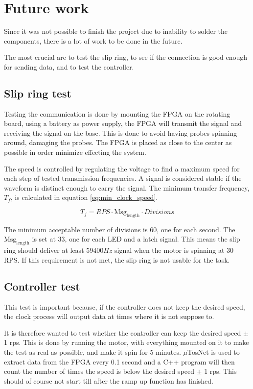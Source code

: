 \section{Future work}
Since it was not possible to finish the project due to inability to solder the components, there is a lot of work to be done in the future.
 
The most crucial are to test the slip ring, to see if the connection is good enough for sending data, and to test the controller.

\subsection{Slip ring test}

Testing the communication is done by mounting the FPGA on the rotating board, using a battery as power supply, the FPGA will transmit the signal and receiving the signal on the base.
This is done to avoid having probes spinning around, damaging the probes.
The FPGA is placed as close to the center as possible in order minimize effecting the system.

The speed is controlled by regulating the voltage to find a maximum speed for each step of tested transmission frequencies.
A signal is considered stable if the waveform is distinct enough to carry the signal.
The minimum transfer frequency, $T_f$, is calculated in equation \ref{eq:min_clock_speed}.

\begin{equation}
  T_f = {RPS \cdot \text{Msg}_\text{length} \cdot Divisions }
 \label{eq:min_clock_speed}
\end{equation}

The minimum acceptable number of divisions is 60, one for each second.
The $\text{Msg}_\text{length}$ is set at 33, one for each LED and a latch signal.
This means the slip ring should deliver at least $59400 Hz$ signal when the motor is spinning at 30 RPS.
If this requirement is not met, the slip ring is not usable for the task.

\subsection{Controller test}
This test is important because, if the controller does not keep the desired speed, the clock process will output data at times where it is not suppose to.

It is therefore wanted to test whether the controller can keep the desired speed $\pm$ 1 rps. 
This is done by running the motor, with everything mounted on it to make the test as real as possible, and make it spin for 5 minutes.
$\mu$TosNet is used to extract data from the FPGA every 0.1 second and a C++ program will then count the number of times the speed is below the desired speed $\pm$ 1 rps.
This should of course not start till after the ramp up function has finished.

